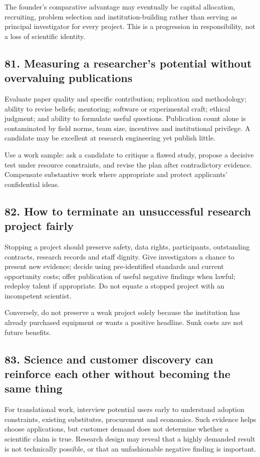 The founder's comparative advantage may eventually be capital allocation, recruiting, problem selection and institution-building rather than serving as principal investigator for every project. This is a progression in responsibility, not a loss of scientific identity.

\subsection{81. Measuring a researcher's potential without overvaluing publications}

Evaluate paper quality and specific contribution; replication and methodology; ability to revise beliefs; mentoring; software or experimental craft; ethical judgment; and ability to formulate useful questions. Publication count alone is contaminated by field norms, team size, incentives and institutional privilege. A candidate may be excellent at research engineering yet publish little.

Use a work sample: ask a candidate to critique a flawed study, propose a decisive test under resource constraints, and revise the plan after contradictory evidence. Compensate substantive work where appropriate and protect applicants' confidential ideas.

\subsection{82. How to terminate an unsuccessful research project fairly}

Stopping a project should preserve safety, data rights, participants, outstanding contracts, research records and staff dignity. Give investigators a chance to present new evidence; decide using pre-identified standards and current opportunity costs; offer publication of useful negative findings when lawful; redeploy talent if appropriate. Do not equate a stopped project with an incompetent scientist.

Conversely, do not preserve a weak project solely because the institution has already purchased equipment or wants a positive headline. Sunk costs are not future benefits.

\subsection{83. Science and customer discovery can reinforce each other without becoming the same thing}

For translational work, interview potential users early to understand adoption constraints, existing substitutes, procurement and economics. Such evidence helps choose applications, but customer demand does not determine whether a scientific claim is true. Research design may reveal that a highly demanded result is not technically possible, or that an unfashionable negative finding is important.

